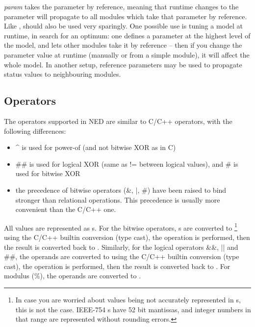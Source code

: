  \textit{param} takes the parameter by reference, meaning that
runtime changes to the parameter will propagate to all modules which
take that parameter by reference. Like , 
should also be used very sparingly. One possible use is tuning a model
at runtime, in search for an optimum: one defines a parameter
at the highest level of the model, and lets other modules take it by reference --
then if you change the parameter value at runtime
(manually or from a simple module), it will affect the whole model.
In another setup, reference parameters may be used to propagate
status values to neighbouring modules.



\subsection{Operators}

The operators supported in NED are similar to C/C++ operators,
with the following differences:

\begin{itemize}
  \item{{\textasciicircum} is used for power-of (and not bitwise XOR as in C)}
  \item{\#\# is used for logical XOR (same as != between logical values), and
        \# is used for bitwise XOR}
  \item{the precedence of bitwise operators (\&, |, \#) have been raised
        to bind stronger than relational operations. This precedence is usually
        more convenient than the C/C++ one.}
\end{itemize}

All values are represented as s. For the bitwise operators,
s are converted to 
  \footnote{In case you are worried about  values being not accurately
  represented in s, this is not the case. IEEE-754 s
  have 52 bit mantissas, and integer numbers in that range are represented
  without rounding errors.}
using the C/C++ builtin conversion (type cast), the operation is performed,
then the result is converted back to .
Similarly, for the logical operators \&\&, || and \#\#,
the operands are converted to  using the C/C++ builtin
conversion (type cast), the operation is performed, then the result
is converted back to . For modulus (\%), the operands are
converted to .

